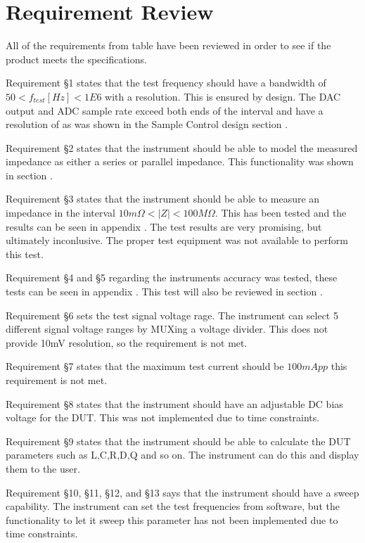 \section{Requirement Review} \label{subsec:8_1_ReqReview}

All of the requirements from table  have been reviewed in order to see if the product meets the specifications.

Requirement §1 states that the test frequency should have a bandwidth of $50 < f_{test} [Hz] < 1E6$ with a  resolution. This is ensured by design. The DAC output and ADC sample rate exceed both ends of the interval and have a resolution of  as was shown in the Sample Control design section .

Requirement §2 states that the instrument should be able to model the measured impedance as either a series or parallel impedance. This functionality was shown in section .

Requirement §3 states that the instrument should be able to measure an impedance in the interval $10m\Omega < |Z| < 100M \Omega$. This has been tested and the results can be seen in appendix . The test results are very promising, but ultimately inconlusive. The proper test equipment was not available to perform this test.

Requirement §4 and §5 regarding the instruments accuracy was tested, these tests can be seen in appendix . This test will also be reviewed in section .

Requirement §6 sets the test signal voltage rage. The instrument can select 5 different signal voltage ranges by MUXing a voltage divider. This does not provide 10mV resolution, so the requirement is not met.

Requirement §7 states that the maximum test current should be $100mApp$ this requirement is not met.

Requirement §8 states that the instrument should have an adjustable DC bias voltage for the DUT. This was not implemented due to time constraints.

Requirement §9 states that the instrument should be able to calculate the DUT parameters such as L,C,R,D,Q and so on. The instrument can do this and display them to the user.

Requirement §10, §11, §12, and §13 says that the instrument should have a sweep capability. The instrument can set the test frequencies from software, but the functionality to let it sweep this parameter has not been implemented due to time constraints.

